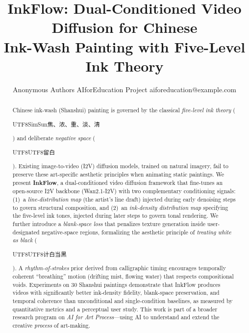 \documentclass{article}
\title{InkFlow: Dual-Conditioned Video Diffusion for Chinese\\
Ink-Wash Painting with Five-Level Ink Theory}
\author{
    Anonymous Authors
    \affiliations
    AIforEducation Project
    \emails
    aiforeducation@example.com
}
\begin{document}
\maketitle

\begin{abstract}
Chinese ink-wash (Shanshui) painting is governed by the classical
\emph{five-level ink theory} (\begin{CJK*}{UTF8}{SimSun}焦、浓、重、淡、清\end{CJK*})
and deliberate \emph{negative space}
(\begin{CJK*}{UTF8}{UTF8}留白\end{CJK*}).
Existing image-to-video (I2V) diffusion models, trained on natural
imagery, fail to preserve these art-specific aesthetic principles when
animating static paintings. We present \textbf{InkFlow}, a
dual-conditioned video diffusion framework that fine-tunes an
open-source I2V backbone (Wan2.1-I2V) with two complementary
conditioning signals: (1)~a \emph{line-distribution map} (the artist's
line draft) injected during early denoising steps to govern structural
composition, and (2)~an \emph{ink-density distribution map}
specifying the five-level ink tones, injected during later steps to
govern tonal rendering. We further introduce a \emph{blank-space loss}
that penalizes texture generation inside user-designated negative-space
regions, formalizing the aesthetic principle of
\emph{treating white as black}
(\begin{CJK*}{UTF8}{UTF8}计白当黑\end{CJK*}).
A \emph{rhythm-of-strokes} prior derived from calligraphic timing
encourages temporally coherent ``breathing'' motion (drifting mist,
flowing water) that respects compositional voids. Experiments on 30
Shanshui paintings demonstrate that InkFlow produces videos with
significantly better ink-density fidelity, blank-space preservation,
and temporal coherence than unconditional and single-condition
baselines, as measured by quantitative metrics and a perceptual user
study. This work is part of a broader research program on
\emph{AI for Art Process}---using AI to understand and extend the
creative \emph{process} of art-making.
\end{abstract}










\end{document}

